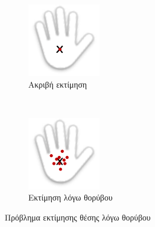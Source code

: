 \begin{figure}[h]
    \centering
    \begin{subfigure}[b]{.3\textwidth}
        \includegraphics[width=\textwidth]{kinect/fig/hand1.png}
        \caption{Ακριβή εκτίμηση}
        \label{fig:hand1}
    \end{subfigure} ~
    \begin{subfigure}[b]{.3\textwidth}
        \includegraphics[width=\textwidth]{kinect/fig/hand2.png}
        \caption{Εκτίμηση λόγω θορύβου}
        \label{fig:hand2}
    \end{subfigure}
    \caption{Πρόβλημα εκτίμησης θέσης λόγω θορύβου\protect\footnotemark}
\end{figure}

